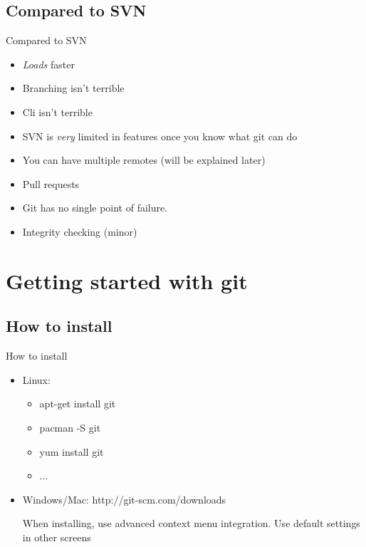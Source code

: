 \documentclass[10pt,a4paper]{beamer}
\begin{document}
\subsection{Compared to SVN}
\begin{frame}{Compared to SVN}
\begin{itemize}
\item \textit{Loads} faster
\item Branching isn't terrible
\item Cli isn't terrible
\item SVN is \textit{very} limited in features once you know what git can do
\item You can have multiple remotes (will be explained later)
\item Pull requests
\item Git has no single point of failure.
\item Integrity checking (minor)

\end{itemize}
\end{frame}


\section{Getting started with git}


\subsection{How to install}
\begin{frame}{How to install}
\begin{itemize}
\item Linux:
\begin{itemize}
\item apt-get install git
\item pacman -S git
\item yum install git
\item ...
\end{itemize}
\item Windows/Mac: http://git-scm.com/downloads

When installing, use advanced context menu integration. Use default settings in other screens
\end{itemize}
\end{frame}
\end{document}
